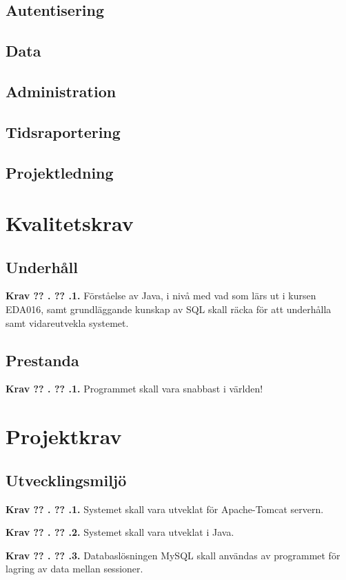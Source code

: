 \documentclass[a4paper]{article}
\newcommand\getcurrentref[1]{%
 \ifnumequal{\value{#1}}{0}
  {??}
  {\the\value{#1}}%
}
\newcommand\requirement[2]{
	\numberedrow{Krav}{#1}{#2}
}
\newcommand\numberedrow[3]{
	\noindent
	\textbf{#1 \getcurrentref{section}.\getcurrentref{subsection}.#2.} #3
	
}
\begin{document}
\subsection{Autentisering}
\subsection{Data}
\subsection{Administration}
\subsection{Tidsraportering}
\subsection{Projektledning}
\section{Kvalitetskrav}
\subsection{Underhåll}
\requirement{1}{Förståelse av Java, i nivå med vad som lärs ut i kursen EDA016, samt grundläggande kunskap av SQL skall räcka för att underhålla samt vidareutvekla systemet.}
\subsection{Prestanda}
\requirement{1}{Programmet skall vara snabbast i världen!}
\section{Projektkrav}
\subsection{Utvecklingsmiljö}
\requirement{1}{Systemet skall vara utveklat för Apache-Tomcat servern.}
\requirement{2}{Systemet skall vara utveklat i Java.}
\requirement{3}{Databaslösningen MySQL skall användas av programmet för lagring av data mellan sessioner.}
\end{document}
